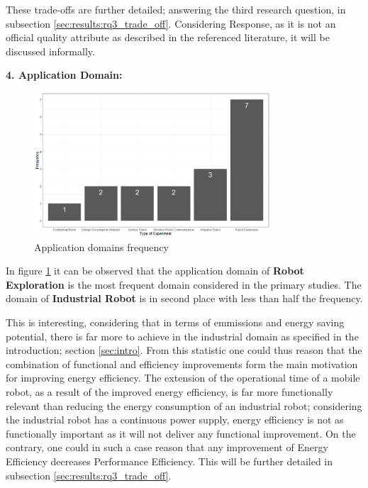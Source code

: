 These trade-offs are further detailed; answering the third research question, in subsection \ref{sec:results:rq3_trade_off}.
Considering Response, as it is not an official quality attribute as described in the referenced literature, it will be discussed informally.

\vspace{2mm}

\noindent\textbf{4. Application Domain:}
\begin{figure}[t]
    \includegraphics[width=250pt]{figures/domain_freq_barplot.png}
    \caption{Application domains frequency}
    \label{fig:app_domains}
\end{figure}
In figure \ref{fig:app_domains} it can be observed that the application domain of \textbf{Robot Exploration} is the most frequent
domain considered in the primary studies. 
The domain of \textbf{Industrial Robot} is in second place with less than half the frequency.

This is interesting, considering that in terms of emmissions and energy saving potential, there is far more to achieve in the industrial domain
as specified in the introduction; section \ref{sec:intro}.
From this statistic one could thus reason that the combination of functional and efficiency improvements form the main motivation for improving energy efficiency. 
The extension of the operational time of a mobile robot, as a result of the improved energy efficiency, 
is far more functionally relevant than reducing the energy consumption of an industrial robot;
considering the industrial robot has a continuous power supply, energy efficiency is not as functionally important as it will
not deliver any functional improvement.
On the contrary, one could in such a case reason that any improvement of Energy Efficiency decreases Performance Efficiency.
This will be further detailed in subsection \ref{sec:results:rq3_trade_off}.

\vspace{2mm}

